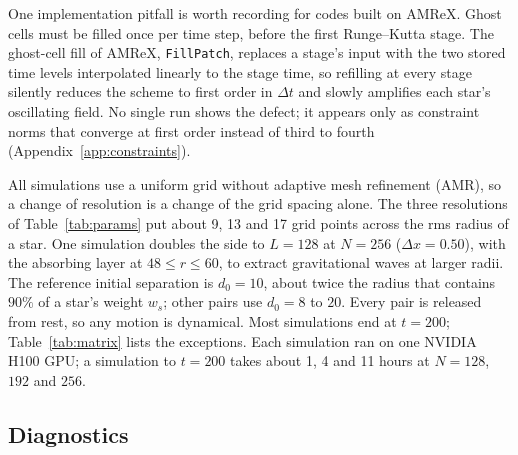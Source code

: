 \documentclass[twocolumn,floatfix,aps,prd,superscriptaddress,nofootinbib]{revtex4-2}
\begin{document}
One implementation pitfall is worth recording for codes built on AMReX. Ghost cells must be filled once per time step, before the first Runge--Kutta stage. The ghost-cell fill of AMReX, \texttt{FillPatch}, replaces a stage's input with the two stored time levels interpolated linearly to the stage time, so refilling at every stage silently reduces the scheme to first order in $\Delta t$ and slowly amplifies each star's oscillating field. No single run shows the defect; it appears only as constraint norms that converge at first order instead of third to fourth (Appendix~\ref{app:constraints}).

All simulations use a uniform grid without adaptive mesh refinement (AMR), so a change of resolution is a change of the grid spacing alone. The three resolutions of Table~\ref{tab:params} put about 9, 13 and 17 grid points across the rms radius of a star. One simulation doubles the side to $L=128$ at $N=256$ ($\Delta x=0.50$), with the absorbing layer at $48\le r\le60$, to extract gravitational waves at larger radii. The reference initial separation is $d_0=10$, about twice the radius that contains $90\%$ of a star's weight $w_s$; other pairs use $d_0=8$ to $20$. Every pair is released from rest, so any motion is dynamical. Most simulations end at $t=200$; Table~\ref{tab:matrix} lists the exceptions. Each simulation ran on one NVIDIA H100 GPU; a simulation to $t=200$ takes about 1, 4 and 11 hours at $N=128$, $192$ and $256$.

\subsection{Diagnostics}
\end{document}
